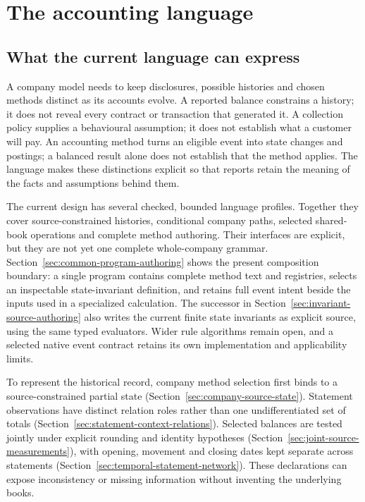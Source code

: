 \chapter{The accounting language}
\label{ch:language}

\section{What the current language can express}

A company model needs to keep disclosures, possible histories and chosen
methods distinct as its accounts evolve. A reported balance constrains a
history; it does not reveal every contract or transaction that generated it.
A collection policy supplies a behavioural assumption; it does not establish
what a customer will pay. An accounting method turns an eligible event into
state changes and postings; a balanced result alone does not establish that
the method applies. The language makes these distinctions explicit so that
reports retain the meaning of the facts and assumptions behind them.

The current design has several checked, bounded language profiles. Together
they cover source-constrained histories, conditional company paths, selected
shared-book operations and complete method authoring. Their interfaces are
explicit, but they are not yet one complete whole-company grammar.
Section~\ref{sec:common-program-authoring} shows the present composition
boundary: a single program contains complete method text and registries,
selects an inspectable state-invariant definition, and retains full event
intent beside the inputs used in a specialized calculation. The successor
in Section~\ref{sec:invariant-source-authoring} also writes the current finite
state invariants as explicit source, using the same typed evaluators. Wider
rule algorithms remain open, and a selected native event contract retains its
own implementation and applicability limits.

To represent the historical record, company method selection first binds to
a source-constrained partial state
(Section~\ref{sec:company-source-state}). Statement observations have
distinct relation roles rather than one undifferentiated set of totals
(Section~\ref{sec:statement-context-relations}). Selected balances are tested
jointly under explicit rounding and identity hypotheses
(Section~\ref{sec:joint-source-measurements}), with opening, movement and
closing dates kept separate across statements
(Section~\ref{sec:temporal-statement-network}). These declarations can expose
inconsistency or missing information without inventing the underlying books.

